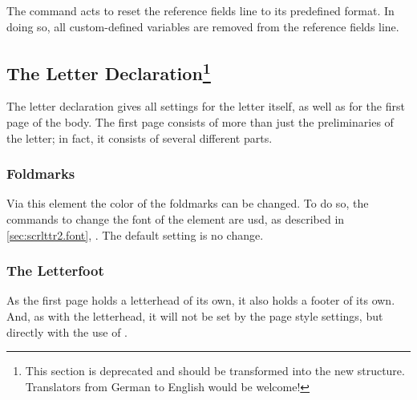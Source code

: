 The command  acts to reset the reference
fields line to its predefined format. In doing so, all custom-defined
variables are removed from the reference fields line.
%
%
%
%
%

\subsection{The Letter Declaration\protect\footnote{This section is
  deprecated and should be transformed into the new structure. Translators
  from German to English would be welcome!}}
\label{sec:scrlttr2-deprecated.startLetter}

The letter declaration gives all settings for the letter itself, as
well as for the first page of the body. The first page consists of
more than just the preliminaries of the letter; in fact, it consists
of several different parts.


\subsubsection{Foldmarks}
\label{sec:scrlttr2-experts-deprecated.foldmarks}
%

\begin{Declaration}
\end{Declaration}
%
Via this element the color of the
foldmarks can be changed. To do so, the commands to change the font of
the element are usd, as described in \autoref{sec:scrlttr2.font},
. The default setting is no change.
%



\subsubsection{The Letterfoot}
\label{sec:scrlttr2-experts.firstFoot}
%

As the first page holds a letterhead of its own, it also holds a
footer of its own. And, as with the letterhead, it will not be set by
the page style settings, but directly with the use of .

